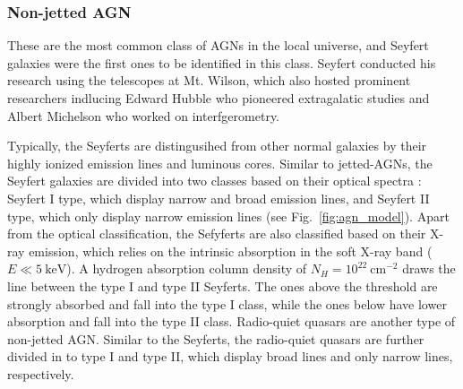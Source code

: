 


\subsubsection{Non-jetted AGN}
These are the most common class of AGNs in the local universe, and Seyfert galaxies \citep{seyfert1943nuclear} were the first ones to be identified in this class. Seyfert conducted his research using the telescopes at Mt. Wilson, which also hosted prominent researchers indlucing Edward Hubble who pioneered extragalatic studies and Albert Michelson who worked on interfgerometry.

Typically, the Seyferts are distingusihed from other normal galaxies by their highly ionized emission lines and luminous cores. Similar to jetted-AGNs, the Seyfert galaxies are divided into two classes based on their optical spectra \citep{khachikian1974atlas}: Seyfert I type, which display narrow and broad emission lines, and Seyfert II type, which only display narrow emission lines (see Fig.~\ref{fig:agn_model}). Apart from the optical classification, the Sefyferts are also classified based on their X-ray emission, which relies on the intrinsic absorption in the soft X-ray band ($E\ll 5~\textrm{keV}$). A hydrogen absorption column density of $N_H=10^{22}~\textrm{cm}^{-2}$ draws the line between the type I and type II Seyferts. The ones above the threshold are strongly absorbed and fall into the type I class, while the ones below have lower absorption and fall into the type II class.  Radio-quiet quasars are another type of non-jetted AGN. Similar to the Seyferts, the radio-quiet quasars are further divided in to type I and type II, which display broad lines and only narrow lines, respectively.
                                                               

